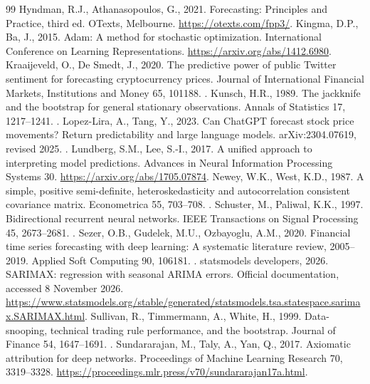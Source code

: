\begin{thebibliography}{99}
 Hyndman, R.J., Athanasopoulos, G., 2021. Forecasting: Principles and Practice, third ed. OTexts, Melbourne. \url{https://otexts.com/fpp3/}.
 Kingma, D.P., Ba, J., 2015. Adam: A method for stochastic optimization. International Conference on Learning Representations. \url{https://arxiv.org/abs/1412.6980}.
 Kraaijeveld, O., De Smedt, J., 2020. The predictive power of public Twitter sentiment for forecasting cryptocurrency prices. Journal of International Financial Markets, Institutions and Money 65, 101188. .
 Kunsch, H.R., 1989. The jackknife and the bootstrap for general stationary observations. Annals of Statistics 17, 1217--1241. .
 Lopez-Lira, A., Tang, Y., 2023. Can ChatGPT forecast stock price movements? Return predictability and large language models. arXiv:2304.07619, revised 2025. .
 Lundberg, S.M., Lee, S.-I., 2017. A unified approach to interpreting model predictions. Advances in Neural Information Processing Systems 30. \url{https://arxiv.org/abs/1705.07874}.
 Newey, W.K., West, K.D., 1987. A simple, positive semi-definite, heteroskedasticity and autocorrelation consistent covariance matrix. Econometrica 55, 703--708. .
 Schuster, M., Paliwal, K.K., 1997. Bidirectional recurrent neural networks. IEEE Transactions on Signal Processing 45, 2673--2681. .
 Sezer, O.B., Gudelek, M.U., Ozbayoglu, A.M., 2020. Financial time series forecasting with deep learning: A systematic literature review, 2005--2019. Applied Soft Computing 90, 106181. .
 statsmodels developers, 2026. SARIMAX: regression with seasonal ARIMA errors. Official documentation, accessed 8 November 2026. \url{https://www.statsmodels.org/stable/generated/statsmodels.tsa.statespace.sarimax.SARIMAX.html}.
 Sullivan, R., Timmermann, A., White, H., 1999. Data-snooping, technical trading rule performance, and the bootstrap. Journal of Finance 54, 1647--1691. .
 Sundararajan, M., Taly, A., Yan, Q., 2017. Axiomatic attribution for deep networks. Proceedings of Machine Learning Research 70, 3319--3328. \url{https://proceedings.mlr.press/v70/sundararajan17a.html}.

\end{thebibliography}
